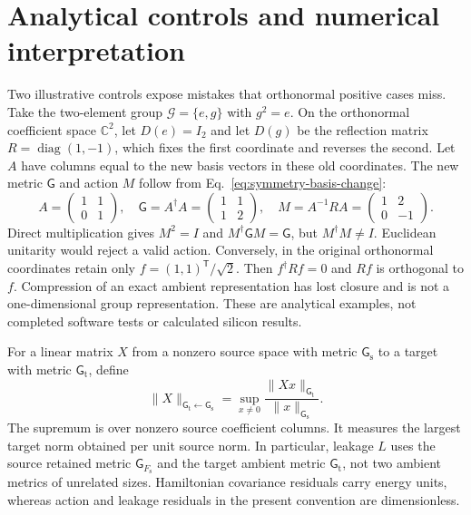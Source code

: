\section{Analytical controls and numerical interpretation}

Two illustrative controls expose mistakes that orthonormal positive cases miss.
Take the two-element group $\mathcal G=\{e,g\}$ with $g^2=e$. On the
orthonormal coefficient space $\mathbb C^2$, let $D(e)=I_2$ and let $D(g)$
be the reflection matrix $R=\operatorname{diag}(1,-1)$, which fixes the first
coordinate and reverses the second. Let $A$ have columns equal to the new
basis vectors in these old coordinates. The new metric $\mathsf G$ and action
$M$ follow from Eq.~\eqref{eq:symmetry-basis-change}:
\begin{equation}
  A=\begin{pmatrix}1&1\\0&1\end{pmatrix},\quad
  \mathsf G=A^{\dagger}A=\begin{pmatrix}1&1\\1&2\end{pmatrix},\quad
  M=A^{-1}RA=\begin{pmatrix}1&2\\0&-1\end{pmatrix}.
  \label{eq:symmetry-nonorthogonal-control}
\end{equation}
Direct multiplication gives $M^2=I$ and $M^{\dagger}\mathsf G M=\mathsf G$,
but $M^{\dagger}M\ne I$. Euclidean unitarity would reject a valid action.
Conversely, in the original orthonormal coordinates retain only
$f=(1,1)^{\mathsf T}/\sqrt2$. Then $f^{\dagger}Rf=0$ and $Rf$ is orthogonal
to $f$. Compression of an exact ambient representation has lost closure and
is not a one-dimensional group representation. These are analytical examples,
not completed software tests or calculated silicon results.

\begin{definition}
\label{def:symmetry-metric-operator-norm}
For a linear matrix $X$ from a nonzero source space with metric
$\mathsf G_{\mathrm s}$ to a target with metric $\mathsf G_{\mathrm t}$,
define
\begin{equation}
  \|X\|_{\mathsf G_{\mathrm t}\leftarrow\mathsf G_{\mathrm s}}
  =\sup_{x\ne0}\frac{\|Xx\|_{\mathsf G_{\mathrm t}}}
                         {\|x\|_{\mathsf G_{\mathrm s}}}.
  \label{eq:symmetry-metric-operator-norm}
\end{equation}
The supremum is over nonzero source coefficient columns. It measures the
largest target norm obtained per unit source norm. In particular, leakage
$L$ uses the source retained metric $\mathsf G_{F_{\mathrm s}}$ and the
target ambient metric $\mathsf G_{\mathrm t}$, not two ambient metrics of
unrelated sizes. Hamiltonian covariance residuals carry energy units, whereas
action and leakage residuals in the present convention are dimensionless.
\end{definition}


